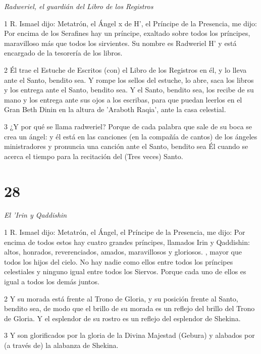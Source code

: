 \par \textit{Radweriel, el guardián del Libro de los Registros}

\par 1 R. Ismael dijo: Metatrón, el Ángel x de H', el Príncipe de la Presencia, me dijo: Por encima de los Serafines hay un príncipe, exaltado sobre todos los príncipes, maravilloso más que todos los sirvientes. Su nombre es Radweriel H' y está encargado de la tesorería de los libros.

\par 2 Él trae el Estuche de Escritos (con) el Libro de los Registros en él, y lo lleva ante el Santo, bendito sea. Y rompe los sellos del estuche, lo abre, saca los libros y los entrega ante el Santo, bendito sea. Y el Santo, bendito sea, los recibe de su mano y los entrega ante sus ojos a los escribas, para que puedan leerlos en el Gran Beth Dinin en la altura de 'Araboth Raqia', ante la casa celestial.

\par 3 ¿Y por qué se llama radweriel? Porque de cada palabra que sale de su boca se crea un ángel: y él está en las canciones (en la compañía de cantos) de los ángeles ministradores y pronuncia una canción ante el Santo, bendito sea Él cuando se acerca el tiempo para la recitación del (Tres veces) Santo.

\chapter{28}

\par \textit{El 'Irin y Qaddishin}

\par 1 R. Ismael dijo: Metatrón, el Ángel, el Príncipe de la Presencia, me dijo: Por encima de todos estos hay cuatro grandes príncipes, llamados Irin y Qaddishin: altos, honrados, reverenciados, amados, maravillosos y gloriosos. , mayor que todos los hijos del cielo. No hay nadie como ellos entre todos los príncipes celestiales y ninguno igual entre todos los Siervos. Porque cada uno de ellos es igual a todos los demás juntos.

\par 2 Y su morada está frente al Trono de Gloria, y su posición frente al Santo, bendito sea, de modo que el brillo de su morada es un reflejo del brillo del Trono de Gloria. Y el esplendor de su rostro es un reflejo del esplendor de Shekina.

\par 3 Y son glorificados por la gloria de la Divina Majestad (Gebura) y alabados por (a través de) la alabanza de Shekina.

